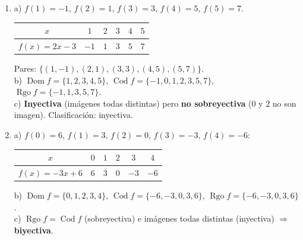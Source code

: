 \documentclass[12pt, letterpaper]{article}
\newcommand{\Dom}{\operatorname{Dom}}
\newcommand{\Cod}{\operatorname{Cod}}
\newcommand{\Rgo}{\operatorname{Rgo}}
\begin{document}
  \begin{enumerate}[leftmargin=*, label=\textbf{\arabic*.}]
    \item a) $f(1) = -1$, $f(2) = 1$, $f(3) = 3$, $f(4) = 5$, $f(5) = 7$.
          \begin{center}
            \begin{tabular}{c|ccccc}
              \toprule
              $x$             & $1$ & $2$ & $3$ & $4$ & $5$ \\
              \midrule
              $f(x) = 2x-3$   & $-1$ & $1$ & $3$ & $5$ & $7$ \\
              \bottomrule
            \end{tabular}
          \end{center}
          Pares: $\{(1,-1), (2,1), (3,3), (4,5), (5,7)\}$.
          \\[2pt]
          b) $\Dom f = \{1,2,3,4,5\}$, \quad $\Cod f = \{-1,0,1,2,3,5,7\}$, \quad $\Rgo f = \{-1,1,3,5,7\}$.
          \\[2pt]
          c) \textbf{Inyectiva} (imágenes todas distintas) pero \textbf{no sobreyectiva} ($0$ y $2$ no son imagen). Clasificación: inyectiva.

    \item a) $f(0) = 6$, $f(1) = 3$, $f(2) = 0$, $f(3) = -3$, $f(4) = -6$:
          \begin{center}
            \begin{tabular}{c|ccccc}
              \toprule
              $x$              & $0$ & $1$ & $2$ & $3$ & $4$ \\
              \midrule
              $f(x) = -3x+6$   & $6$ & $3$ & $0$ & $-3$ & $-6$ \\
              \bottomrule
            \end{tabular}
          \end{center}
          \par\vspace{4pt}
          b) $\Dom f = \{0,1,2,3,4\}$, \quad $\Cod f = \{-6,-3,0,3,6\}$, \quad $\Rgo f = \{-6,-3,0,3,6\}$.
          \\[2pt]
          c) $\Rgo f = \Cod f$ (sobreyectiva) e imágenes todas distintas (inyectiva) $\Rightarrow$ \textbf{biyectiva}.
  \end{enumerate}

\fi
\end{document}
